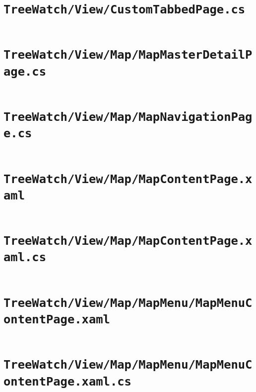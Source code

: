 \documentclass[12pt]{article}
\begin{document}
\tableofcontents
\clearpage




\section{\texttt{TreeWatch/View/CustomTabbedPage.cs}}
	\inputminted[linenos,firstline=22]{csharp}{../../../src/TreeWatch/View/CustomTabbedPage.cs}
	\pagebreak

\section{\texttt{TreeWatch/View/Map/MapMasterDetailPage.cs}}
	\inputminted[linenos,firstline=22]{csharp}{../../../src/TreeWatch/View/Map/MapMasterDetailPage.cs}
	\pagebreak

\section{\texttt{TreeWatch/View/Map/MapNavigationPage.cs}}
	\inputminted[linenos,firstline=22]{csharp}{../../../src/TreeWatch/View/Map/MapNavigationPage.cs}
	\pagebreak

\section{\texttt{TreeWatch/View/Map/MapContentPage.xaml}}
	\inputminted[linenos]{xml}{../../../src/TreeWatch/View/Map/MapContentPage.xaml}
	\pagebreak

\section{\texttt{TreeWatch/View/Map/MapContentPage.xaml.cs}}
	\inputminted[linenos,firstline=22]{csharp}{../../../src/TreeWatch/View/Map/MapContentPage.xaml.cs}
	\pagebreak

\section[\texttt{TreeWatch/View/Map/…/MapMenuContentPage.xaml}]
{\texttt{TreeWatch/View/Map/MapMenu/\linebreak MapMenuContentPage.xaml}}
	\inputminted[linenos]{xml}{../../../src/TreeWatch/View/Map/MapMenu/MapMenuContentPage.xaml}
	\pagebreak

\section[\texttt{TreeWatch/View/Map/…/MapMenuContentPage.xaml.cs}]
{\texttt{TreeWatch/View/Map/MapMenu/\linebreak MapMenuContentPage.xaml.cs}}
	\inputminted[linenos,firstline=22]{csharp}{../../../src/TreeWatch/View/Map/MapMenu/MapMenuContentPage.xaml.cs}
	\pagebreak
\end{document}
